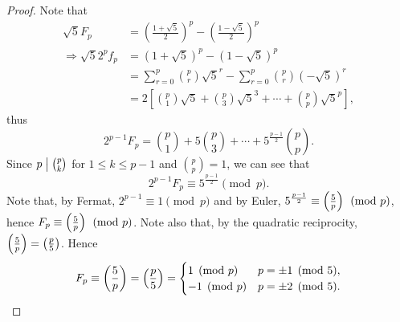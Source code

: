 \begin{proof}
    Note that
    \begin{align*}
        \sqrt{5} F_p &= \left(\frac{1+\sqrt{5}}{2}\right)^p - \left(\frac{1-\sqrt{5}}{2}\right)^p \\
        \Rightarrow \sqrt{5} 2^pf_p &= \left(1+\sqrt{5}\right)^p - \left(1-\sqrt{5}\right)^p \\
        &= \sum_{r=0}^p \binom{p}{r}\sqrt{5}^r - \sum_{r=0}^p \binom{p}{r}\left(-\sqrt{5}\right)^r \\
        &= 2\left[\binom{p}{1}\sqrt{5} + \binom{p}{3}\sqrt{5}^3 + \cdots + \binom{p}{p}\sqrt{5}^p\right],
    \end{align*}
    thus
    \[
        2^{p-1}F_p = \binom{p}{1} + 5\binom{p}{3} + \cdots + 5^{\frac{p-1}{2}}\binom{p}{p}.
    \]
    Since $p \bigm| \binom{p}{k}$ for $1 \leq k \leq p-1$ and $\binom{p}{p}=1$, we can see that
    \[
        2^{p-1}F_p \equiv 5^{\frac{p-1}{2}} \pmod{p}.
    \]
    Note that, by Fermat, $2^{p-1} \equiv 1 \pmod{p}$ and by Euler, $5^{\frac{p-1}{2}}\equiv\left(\frac{5}{p}\right) \pmod{p}$,
    hence $F_p \equiv \left(\frac{5}{p}\right) \pmod{p}$. Note also that, by the quadratic reciprocity, $\left(\frac{5}{p}\right)=\left(\frac{p}{5}\right)$.
    Hence
    \[
        F_p \equiv \left(\frac{5}{p}\right) = \left(\frac{p}{5}\right) = \begin{cases}
            1 \pmod{p} & p = \pm 1 \pmod{5}, \\
            -1 \pmod{p} & p = \pm 2 \pmod{5}.
        \end{cases}
    \]
\end{proof}

